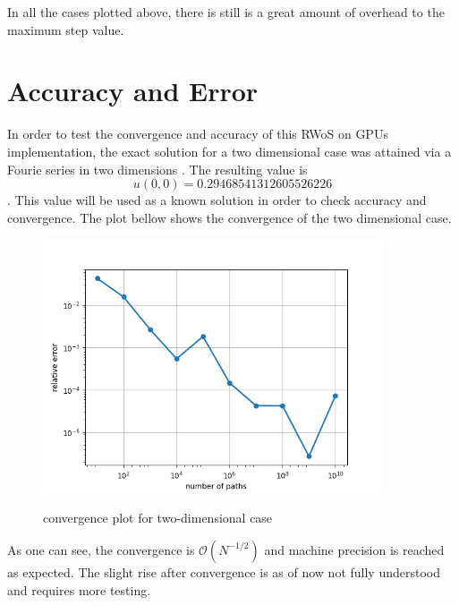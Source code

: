In all the cases plotted above, there is still is a great amount of overhead
to the maximum step value.  

\section{Accuracy and Error}
In order to test the convergence and accuracy of this \Gls{RWoS} on \Glspl{GPU} implementation,
the exact solution for a two dimensional case was attained via a Fourie series in
two dimensions \cite{Bornemann}.  The resulting value is  $$u(0,0) = 0.29468 54131 26055 26226$$.
This value will be used as a known solution in order to check accuracy and convergence.
The plot bellow shows the convergence of the two dimensional case.

\begin{figure}
\begin{center}
\includegraphics[width=10.0cm]{styles/convergence} \label{plot:convergence}
  \caption{convergence plot for two-dimensional case}
\end{center}
\end{figure}

As one can see, the convergence is $\mathcal{O}(N^{-1/2})$ and machine precision is reached
as expected.  The slight rise after convergence is as of now not fully understood and
requires more testing.



